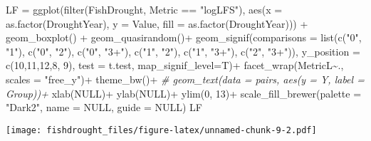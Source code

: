 \documentclass[
]{article}
\newenvironment{Shaded}{\begin{snugshade}}{\end{snugshade}}
\newcommand{\AttributeTok}[1]{\textcolor[rgb]{0.77,0.63,0.00}{#1}}
\newcommand{\CommentTok}[1]{\textcolor[rgb]{0.56,0.35,0.01}{\textit{#1}}}
\newcommand{\ConstantTok}[1]{\textcolor[rgb]{0.00,0.00,0.00}{#1}}
\newcommand{\DecValTok}[1]{\textcolor[rgb]{0.00,0.00,0.81}{#1}}
\newcommand{\FunctionTok}[1]{\textcolor[rgb]{0.00,0.00,0.00}{#1}}
\newcommand{\NormalTok}[1]{#1}
\newcommand{\OtherTok}[1]{\textcolor[rgb]{0.56,0.35,0.01}{#1}}
\newcommand{\SpecialCharTok}[1]{\textcolor[rgb]{0.00,0.00,0.00}{#1}}
\newcommand{\StringTok}[1]{\textcolor[rgb]{0.31,0.60,0.02}{#1}}
\begin{document}
\begin{Shaded}
\begin{Highlighting}[]
\NormalTok{LF }\OtherTok{=} \FunctionTok{ggplot}\NormalTok{(}\FunctionTok{filter}\NormalTok{(FishDrought, Metric }\SpecialCharTok{==} \StringTok{"logLFS"}\NormalTok{),  }\FunctionTok{aes}\NormalTok{(}\AttributeTok{x =} \FunctionTok{as.factor}\NormalTok{(DroughtYear), }\AttributeTok{y =}\NormalTok{ Value, }\AttributeTok{fill =} \FunctionTok{as.factor}\NormalTok{(DroughtYear))) }\SpecialCharTok{+} 
  \FunctionTok{geom\_boxplot}\NormalTok{() }\SpecialCharTok{+}
  \FunctionTok{geom\_quasirandom}\NormalTok{()}\SpecialCharTok{+}
  \FunctionTok{geom\_signif}\NormalTok{(}\AttributeTok{comparisons =} \FunctionTok{list}\NormalTok{(}\FunctionTok{c}\NormalTok{(}\StringTok{"0"}\NormalTok{, }\StringTok{"1"}\NormalTok{), }\FunctionTok{c}\NormalTok{(}\StringTok{"0"}\NormalTok{, }\StringTok{"2"}\NormalTok{), }\FunctionTok{c}\NormalTok{(}\StringTok{"0"}\NormalTok{, }\StringTok{"3+"}\NormalTok{), }
                                 \FunctionTok{c}\NormalTok{(}\StringTok{"1"}\NormalTok{, }\StringTok{"2"}\NormalTok{), }\FunctionTok{c}\NormalTok{(}\StringTok{"1"}\NormalTok{, }\StringTok{"3+"}\NormalTok{), }\FunctionTok{c}\NormalTok{(}\StringTok{"2"}\NormalTok{, }\StringTok{"3+"}\NormalTok{)), }
              \AttributeTok{y\_position =} \FunctionTok{c}\NormalTok{(}\DecValTok{10}\NormalTok{,}\DecValTok{11}\NormalTok{,}\DecValTok{12}\NormalTok{,}\DecValTok{8}\NormalTok{, }\DecValTok{9}\NormalTok{), }\AttributeTok{test =}\NormalTok{ t.test, }
              \AttributeTok{map\_signif\_level=}\NormalTok{T)}\SpecialCharTok{+}
  \FunctionTok{facet\_wrap}\NormalTok{(MetricL}\SpecialCharTok{\textasciitilde{}}\NormalTok{., }\AttributeTok{scales =} \StringTok{"free\_y"}\NormalTok{)}\SpecialCharTok{+} \FunctionTok{theme\_bw}\NormalTok{()}\SpecialCharTok{+}
 \CommentTok{\# geom\_text(data = pairs, aes(y = Y, label = Group))+}
  \FunctionTok{xlab}\NormalTok{(}\ConstantTok{NULL}\NormalTok{)}\SpecialCharTok{+} \FunctionTok{ylab}\NormalTok{(}\ConstantTok{NULL}\NormalTok{)}\SpecialCharTok{+} \FunctionTok{ylim}\NormalTok{(}\DecValTok{0}\NormalTok{, }\DecValTok{13}\NormalTok{)}\SpecialCharTok{+}
  \FunctionTok{scale\_fill\_brewer}\NormalTok{(}\AttributeTok{palette =} \StringTok{"Dark2"}\NormalTok{, }\AttributeTok{name =} \ConstantTok{NULL}\NormalTok{, }\AttributeTok{guide =} \ConstantTok{NULL}\NormalTok{)}
\NormalTok{LF}
\end{Highlighting}
\end{Shaded}

\texttt{[image: fishdrought\_files/figure-latex/unnamed-chunk-9-2.pdf]}
\end{document}
